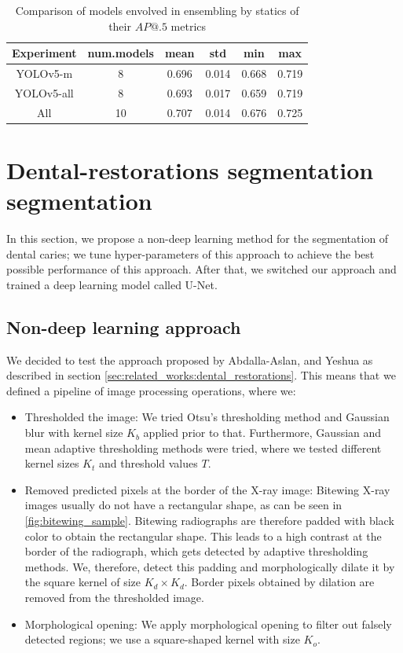 \begin{table}[h]
    \centering
    \begin{tabular}{|c|c|c|c|c|c|}
        \hline
        Experiment & num.models & mean  & std   & min   & max   \\ \hline
        YOLOv5-m   & 8          & 0.696 & 0.014 & 0.668 & 0.719 \\ \hline
        YOLOv5-all & 8          & 0.693 & 0.017 & 0.659 & 0.719 \\ \hline
        All        & 10         & 0.707 & 0.014 & 0.676 & 0.725 \\ \hline
    \end{tabular}
    \caption{Comparison of models envolved in ensembling by statics of their $AP@.5$ metrics}
    \label{tab:ensemble_models_involved}
\end{table}

\section{Dental-restorations segmentation segmentation}
\label{sec:methods:dental_restorations}
In this section, we propose a non-deep learning method for the segmentation of dental caries; we tune hyper-parameters of this approach to achieve the best possible performance of this approach. After that, we switched our approach and trained a deep learning model called U-Net.
\subsection{Non-deep learning approach}
\label{sec:methods:seg_nondl}
We decided to test the approach proposed by Abdalla-Aslan, and Yeshua \cite{AbdallaAslan2020, Yeshua2019} as described in section \ref{sec:related_works:dental_restorations}. This means that we defined a pipeline of image processing operations, where we:
\begin{itemize}
    \item Thresholded the image: We tried Otsu's thresholding method and Gaussian blur with kernel size $K_b$ applied prior to that. Furthermore, Gaussian and mean adaptive thresholding methods were tried, where we tested different kernel sizes $K_t$ and threshold values $T$.
    \item Removed predicted pixels at the border of the X-ray image: Bitewing X-ray images usually do not have a rectangular shape, as can be seen in \ref{fig:bitewing_sample}. Bitewing radiographs are therefore padded with black color to obtain the rectangular shape. This leads to a high contrast at the border of the radiograph, which gets detected by adaptive thresholding methods. We, therefore, detect this padding and morphologically dilate it by the square kernel of size $K_d \times K_d$. Border pixels obtained by dilation are removed from the thresholded image.
    \item Morphological opening: We apply morphological opening to filter out falsely detected regions; we use a square-shaped kernel with size $K_o$.
\end{itemize}


